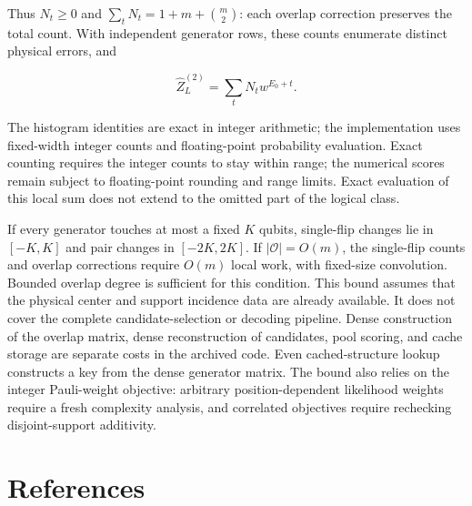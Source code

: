 \documentclass[
  10pt,
]{article}
\begin{document}
Thus \(N_t\ge0\) and \(\sum_tN_t=1+m+\binom m2\): each overlap
correction preserves the total count. With independent generator rows,
these counts enumerate distinct physical errors, and

\[
\widehat Z_L^{(2)}=\sum_tN_t w^{E_0+t}.
\]

The histogram identities are exact in integer arithmetic; the
implementation uses fixed-width integer counts and floating-point
probability evaluation. Exact counting requires the integer counts to
stay within range; the numerical scores remain subject to floating-point
rounding and range limits. Exact evaluation of this local sum does not
extend to the omitted part of the logical class.

If every generator touches at most a fixed \(K\) qubits, single-flip
changes lie in \([-K,K]\) and pair changes in \([-2K,2K]\). If
\(|\mathcal O|=O(m)\), the single-flip counts and overlap corrections
require \(O(m)\) local work, with fixed-size convolution. Bounded
overlap degree is sufficient for this condition. This bound assumes that
the physical center and support incidence data are already available. It
does not cover the complete candidate-selection or decoding pipeline.
Dense construction of the overlap matrix, dense reconstruction of
candidates, pool scoring, and cache storage are separate costs in the
archived code. Even cached-structure lookup constructs a key from the
dense generator matrix. The bound also relies on the integer
Pauli-weight objective: arbitrary position-dependent likelihood weights
require a fresh complexity analysis, and correlated objectives require
rechecking disjoint-support additivity.

\section{References}\label{references}
\end{document}
